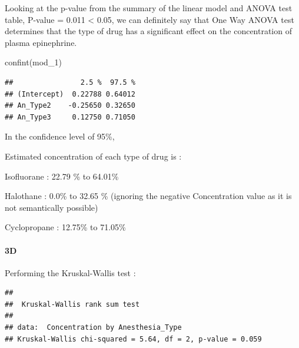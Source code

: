 \documentclass[
]{article}
\newenvironment{Shaded}{\begin{snugshade}}{\end{snugshade}}
\newcommand{\AttributeTok}[1]{\textcolor[rgb]{0.77,0.63,0.00}{#1}}
\newcommand{\FunctionTok}[1]{\textcolor[rgb]{0.00,0.00,0.00}{#1}}
\newcommand{\NormalTok}[1]{#1}
\newcommand{\OtherTok}[1]{\textcolor[rgb]{0.56,0.35,0.01}{#1}}
\newcommand{\SpecialCharTok}[1]{\textcolor[rgb]{0.00,0.00,0.00}{#1}}
\begin{document}
Looking at the p-value from the summary of the linear model and ANOVA
test table, P-value = 0.011 \textless{} 0.05, we can definitely say that
One Way ANOVA test determines that the type of drug has a significant
effect on the concentration of plasma epinephrine.

\begin{Shaded}
\begin{Highlighting}[]
\FunctionTok{confint}\NormalTok{(mod\_1)}
\end{Highlighting}
\end{Shaded}

\begin{verbatim}
##                2.5 %  97.5 %
## (Intercept)  0.22788 0.64012
## An_Type2    -0.25650 0.32650
## An_Type3     0.12750 0.71050
\end{verbatim}

In the confidence level of 95\%,

Estimated concentration of each type of drug is :

Isofluorane : 22.79 \% to 64.01\%

Halothane : 0.0\% to 32.65 \% (ignoring the negative Concentration value
as it is not semantically possible)

Cyclopropane : 12.75\% to 71.05\%

\hypertarget{d-2}{%
\paragraph{\texorpdfstring{\textbf{3D}}{3D}}\label{d-2}}

Performing the Kruskal-Wallis test :

\begin{Shaded}
\end{Shaded}

\begin{verbatim}
## 
##  Kruskal-Wallis rank sum test
## 
## data:  Concentration by Anesthesia_Type
## Kruskal-Wallis chi-squared = 5.64, df = 2, p-value = 0.059
\end{verbatim}
\end{document}
